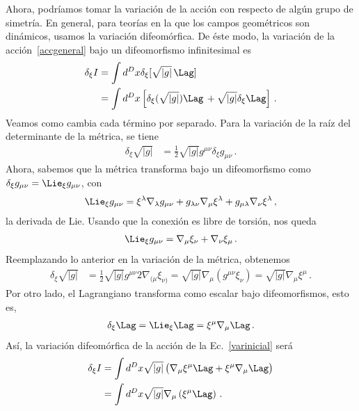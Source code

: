 \documentclass[../Main.tex]{subfiles}
\begin{document}
Ahora, podríamos tomar la variación de la acción con respecto de algún grupo de simetría. En general, para teorías en la que los campos geométricos son dinámicos, usamos la variación difeomórfica. De éste modo, la variación de la acción~\eqref{accgeneral} bajo un difeomorfismo infinitesimal es
\begin{align} \notag
     \delta_{\xi} I&= \int d^{D}x \delta_{\xi}[\sqrt{\lvert g\rvert}\, \Lag]\\
     &=\int d^{D}x \left[\delta_{\xi}(\sqrt{\lvert g\rvert})\Lag\,+ \sqrt{\lvert g\rvert}\delta_{\xi} \Lag\right] \, . 
\end{align}
Veamos como cambia cada término por separado. Para la variación de la raíz del determinante de la métrica, se tiene
\begin{align}
\delta_{\xi}\sqrt{\lvert g\rvert}&=\frac{1}{2}\sqrt{\lvert g\rvert}g^{\mu\nu}\delta_{\xi}g_{\mu\nu}\, .
\end{align}
Ahora, sabemos que la métrica transforma bajo un difeomorfismo como $\delta_{\xi}g_{\mu\nu}=\Lie_{\xi}g_{\mu\nu}$, con 
\begin{align}
\Lie_{\xi}g_{\mu\nu}=\xi^{\lambda}\nabla_{\lambda}g_{\mu\nu}+g_{\lambda\nu}\nabla_{\mu}\xi^{\lambda}+g_{\mu\lambda}\nabla_{\nu}\xi^{\lambda}\, ,
\end{align}
la derivada de Lie. Usando que la conexión es libre de torsión, nos queda
\begin{align}
\Lie_{\xi}g_{\mu\nu}=\nabla_{\mu}\xi_{\nu}+\nabla_{\nu}\xi_{\mu}\, .
\end{align}
Reemplazando lo anterior en la variación de la métrica, obtenemos
\begin{align}
    \delta_{\xi}\sqrt{\lvert g\rvert}&=\frac{1}{2}\sqrt{\lvert g\rvert}g^{\mu\nu}2\nabla_{(\mu}\xi_{\nu)}=\sqrt{\lvert g\rvert}\nabla_{\mu}(g^{\mu\nu}\xi_{\nu})=\sqrt{\lvert g\rvert}\nabla_{\mu}\xi^{\mu}\, . \label{varxi}
\end{align}
Por otro lado, el Lagrangiano transforma como escalar bajo difeomorfismos, esto es, 
\begin{align}
    \delta_{\xi} \Lag=\Lie_{\xi} \Lag=\xi^{\mu}\nabla_{\mu}\Lag\, .
\end{align}
Así, la variación difeomórfica de la acción de la Ec.~\eqref{varinicial} será
\begin{align}\notag
    \delta_{\xi} I
     &=\int d^{D}x \sqrt{\lvert g\rvert}\left(\nabla_{\mu}\xi^{\mu}\Lag+\xi^{\mu}\nabla_{\mu}\Lag\right)\\
     &=\int d^{D}x \sqrt{\lvert g\rvert}\nabla_{\mu}\left(\xi^{\mu}\Lag\right)\, . \label{vardifeo}
\end{align}
\end{document}
